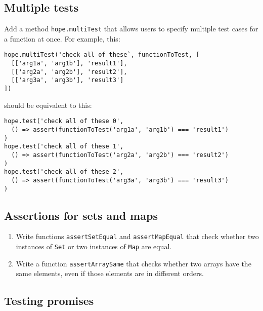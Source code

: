 \documentclass[krantzl]{krantz}
\begin{document}
\subsection*{Multiple tests}


Add a method \texttt{hope.multiTest} that allows users to specify
multiple test cases for a function at once.
For example, this:

\begin{lstlisting}[frame=single,frameround=tttt]
hope.multiTest('check all of these`, functionToTest, [
  [['arg1a', 'arg1b'], 'result1'],
  [['arg2a', 'arg2b'], 'result2'],
  [['arg3a', 'arg3b'], 'result3']
])
\end{lstlisting}


\noindent should be equivalent to this:

\begin{lstlisting}[frame=single,frameround=tttt]
hope.test('check all of these 0',
  () => assert(functionToTest('arg1a', 'arg1b') === 'result1')
)
hope.test('check all of these 1',
  () => assert(functionToTest('arg2a', 'arg2b') === 'result2')
)
hope.test('check all of these 2',
  () => assert(functionToTest('arg3a', 'arg3b') === 'result3')
)
\end{lstlisting}

\subsection*{Assertions for sets and maps}

\begin{enumerate}

\item 

Write functions \texttt{assertSetEqual} and \texttt{assertMapEqual}
    that check whether two instances of \texttt{Set} or two instances of \texttt{Map} are equal.



\item 

Write a function \texttt{assertArraySame}
    that checks whether two arrays have the same elements,
    even if those elements are in different orders.



\end{enumerate}

\subsection*{Testing promises}
\end{document}
